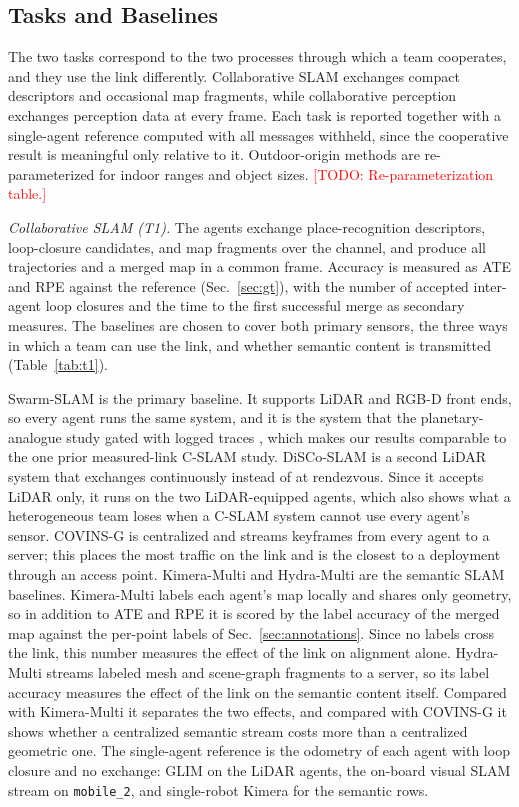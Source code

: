 \documentclass[journal]{IEEEtran}
\newcommand{\todo}[1]{\textcolor{red}{[TODO: #1]}}
\begin{document}


\subsection{Tasks and Baselines}
\label{sec:tasks}
The two tasks correspond to the two processes through which a team
cooperates, and they use the link differently. Collaborative SLAM
exchanges compact descriptors and occasional map fragments, while
collaborative perception exchanges perception data at every frame.
Each task is reported together with a single-agent reference computed
with all messages withheld, since the cooperative result is
meaningful only relative to it. Outdoor-origin methods are
re-parameterized for indoor ranges and object sizes.
\todo{Re-parameterization table.}

\emph{Collaborative SLAM (T1).} The agents exchange place-recognition
descriptors, loop-closure candidates, and map fragments over the
channel, and produce all trajectories and a merged map in a common
frame. Accuracy is measured as ATE and RPE against the reference
(Sec.~\ref{sec:gt}), with the number of accepted inter-agent loop
closures and the time to the first successful merge as secondary
measures. The baselines are chosen to cover both primary sensors, the
three ways in which a team can use the link, and whether semantic
content is transmitted (Table~\ref{tab:t1}).

Swarm-SLAM \cite{swarmslam} is the primary baseline. It supports LiDAR
and RGB-D front ends, so every agent runs the same system, and it is
the system that the planetary-analogue study gated with logged traces
\cite{planetary_cslam}, which makes our results comparable to the one
prior measured-link C-SLAM study. DiSCo-SLAM \cite{discoslam} is a
second LiDAR system that exchanges continuously instead of at
rendezvous. Since it accepts LiDAR only, it runs on the two
LiDAR-equipped agents, which also shows what a heterogeneous team
loses when a C-SLAM system cannot use every agent's sensor. COVINS-G
\cite{covinsg} is centralized and streams keyframes from every agent
to a server; this places the most traffic on the link and is the
closest to a deployment through an access point. Kimera-Multi
\cite{kimeramulti} and Hydra-Multi \cite{hydramulti} are the semantic
SLAM baselines. Kimera-Multi labels each agent's map locally and
shares only geometry, so in addition to ATE and RPE it is scored by
the label accuracy of the merged map against the per-point labels of
Sec.~\ref{sec:annotations}. Since no labels cross the link, this
number measures the effect of the link on alignment alone.
Hydra-Multi streams labeled mesh and scene-graph fragments to a
server, so its label accuracy measures the effect of the link on the
semantic content itself. Compared with Kimera-Multi it separates the
two effects, and compared with COVINS-G it shows whether a centralized
semantic stream costs more than a centralized geometric one. The
single-agent reference is the odometry of each agent with loop
closure and no exchange: GLIM \cite{glim} on the LiDAR agents, the
on-board visual SLAM stream on \texttt{mobile\_2}, and single-robot
Kimera for the semantic rows.
\end{document}
